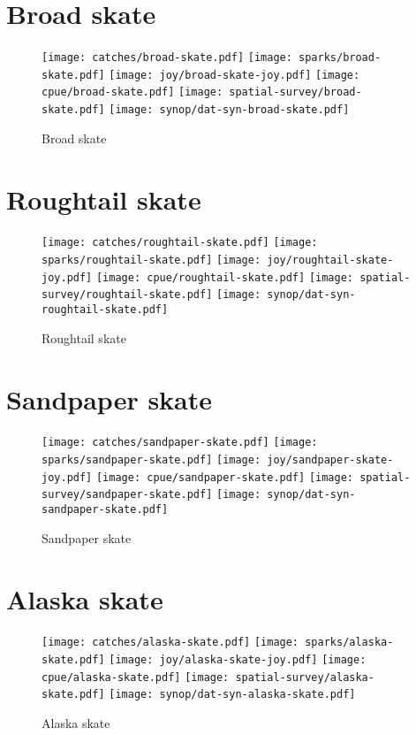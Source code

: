 \section*{Broad skate}

\begin{figure}[htbp]
\centering
\texttt{[image: catches/broad-skate.pdf]}
\texttt{[image: sparks/broad-skate.pdf]}
\texttt{[image: joy/broad-skate-joy.pdf]}
\texttt{[image: cpue/broad-skate.pdf]}
\texttt{[image: spatial-survey/broad-skate.pdf]}
\texttt{[image: synop/dat-syn-broad-skate.pdf]}
\caption{Broad skate}
\end{figure}
\clearpage
\section*{Roughtail skate}

\begin{figure}[htbp]
\centering
\texttt{[image: catches/roughtail-skate.pdf]}
\texttt{[image: sparks/roughtail-skate.pdf]}
\texttt{[image: joy/roughtail-skate-joy.pdf]}
\texttt{[image: cpue/roughtail-skate.pdf]}
\texttt{[image: spatial-survey/roughtail-skate.pdf]}
\texttt{[image: synop/dat-syn-roughtail-skate.pdf]}
\caption{Roughtail skate}
\end{figure}
\clearpage
\section*{Sandpaper skate}

\begin{figure}[htbp]
\centering
\texttt{[image: catches/sandpaper-skate.pdf]}
\texttt{[image: sparks/sandpaper-skate.pdf]}
\texttt{[image: joy/sandpaper-skate-joy.pdf]}
\texttt{[image: cpue/sandpaper-skate.pdf]}
\texttt{[image: spatial-survey/sandpaper-skate.pdf]}
\texttt{[image: synop/dat-syn-sandpaper-skate.pdf]}
\caption{Sandpaper skate}
\end{figure}
\clearpage
\section*{Alaska skate}

\begin{figure}[htbp]
\centering
\texttt{[image: catches/alaska-skate.pdf]}
\texttt{[image: sparks/alaska-skate.pdf]}
\texttt{[image: joy/alaska-skate-joy.pdf]}
\texttt{[image: cpue/alaska-skate.pdf]}
\texttt{[image: spatial-survey/alaska-skate.pdf]}
\texttt{[image: synop/dat-syn-alaska-skate.pdf]}
\caption{Alaska skate}
\end{figure}
\clearpage
